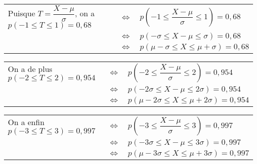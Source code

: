 \vspace*{.5cm}

\begin{tabular}{lll}
\hspace{-.3cm} Puisque $T = \dfrac{X - \mu}{\sigma}$, on a $p\left(-1 \leqslant T \leqslant 1\right) = 0,68$ & $\Longleftrightarrow$ & $p\left(-1 \leqslant \dfrac{X-\mu}{\sigma} \leqslant 1\right) = 0,68$ \vspace*{.3cm} \\
& $\Longleftrightarrow$ & $p\left(-\sigma \leqslant X - \mu \leqslant \sigma\right) = 0,68$ \vspace*{.3cm} \\
& $\Longleftrightarrow$ & $p\left(\mu - \sigma \leqslant X \leqslant \mu + \sigma\right) = 0,68$ \\
\end{tabular}

\vspace*{.5cm}

\begin{tabular}{lll}
\hspace{-.3cm} On a de plus $p\left(-2 \leqslant T \leqslant 2\right) = 0,954$ & $\Longleftrightarrow$ & $p\left(-2 \leqslant \dfrac{X-\mu}{\sigma} \leqslant 2\right) = 0,954$ \vspace*{.3cm} \\
& $\Longleftrightarrow$ & $p\left(-2\sigma \leqslant X - \mu \leqslant 2\sigma\right) = 0,954$ \vspace*{.3cm} \\
& $\Longleftrightarrow$ & $p\left(\mu - 2\sigma \leqslant X \leqslant \mu + 2\sigma\right) = 0,954$ \\
\end{tabular}

\vspace*{.5cm}

\begin{tabular}{lll}
\hspace{-.3cm} On a enfin $p\left(-3 \leqslant T \leqslant 3\right) = 0,997$ & $\Longleftrightarrow$ & $p\left(-3 \leqslant \dfrac{X-\mu}{\sigma} \leqslant 3\right) = 0,997$ \vspace*{.3cm} \\
& $\Longleftrightarrow$ & $p\left(-3\sigma \leqslant X - \mu \leqslant 3\sigma\right) = 0,997$ \vspace*{.3cm} \\
& $\Longleftrightarrow$ & $p\left(\mu - 3\sigma \leqslant X \leqslant \mu + 3\sigma\right) = 0,997$ \\
\end{tabular}

